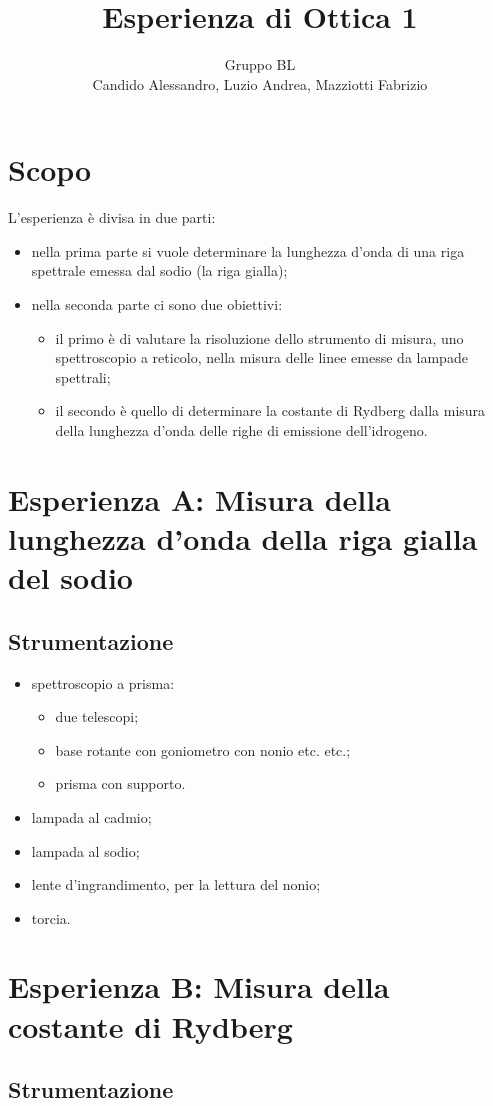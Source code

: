 \documentclass[a4paper,10pt]{article}
\title{Esperienza di Ottica 1}
\author{Gruppo BL \\ Candido Alessandro, Luzio Andrea, Mazziotti Fabrizio}
\begin{document}
\maketitle

\section{Scopo}
L'esperienza è divisa in due parti:
\begin{itemize}
	\item nella prima parte si vuole determinare la lunghezza d’onda di una riga spettrale emessa dal sodio (la riga gialla);
	\item nella seconda parte ci sono due obiettivi:
	\begin{itemize}
		\item il primo è di valutare la risoluzione dello strumento di misura, uno spettroscopio a reticolo, nella misura delle linee emesse da lampade spettrali;
		\item il secondo è quello di determinare la costante di Rydberg dalla misura della lunghezza d’onda delle righe di emissione dell’idrogeno.
	\end{itemize}
\end{itemize}

\section{Esperienza A: Misura della lunghezza d'onda della riga gialla del sodio}

\subsection{Strumentazione}

\begin{itemize}
	\item spettroscopio a prisma:
	\begin{itemize} %
		\item due telescopi;
		\item base rotante con goniometro con nonio etc. etc.;
		\item prisma con supporto.
	\end{itemize}
	\item lampada al cadmio;
	\item lampada al sodio;
	\item lente d'ingrandimento, per la lettura del nonio;
	\item torcia.
\end{itemize}

\section{Esperienza B: Misura della costante di Rydberg}

\subsection{Strumentazione}
\end{document}
